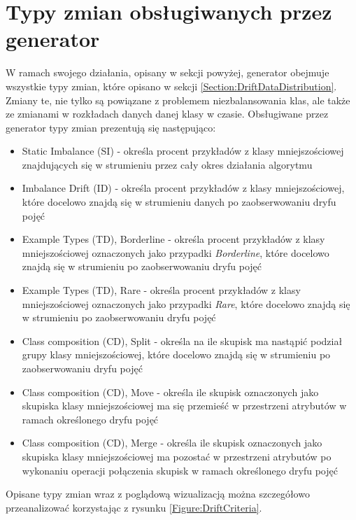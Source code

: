 \section{Typy zmian obsługiwanych przez generator}

\noindent W ramach swojego działania, opisany w sekcji powyżej, generator obejmuje wszystkie typy zmian, które opisano w sekcji \ref{Section:DriftDataDistribution}. Zmiany te, nie tylko są powiązane z problemem niezbalansowania klas, ale także ze zmianami w rozkładach danych danej klasy w czasie. Obsługiwane przez generator typy zmian prezentują się następująco:

\begin{itemize}
    \item Static Imbalance (SI) - określa procent przykładów z klasy mniejszościowej znajdujących się w strumieniu przez cały okres działania algorytmu
    \item Imbalance Drift (ID) - określa procent przykładów z klasy mniejszościowej, które docelowo znajdą się w strumieniu danych po zaobserwowaniu dryfu pojęć
    \item Example Types (TD), Borderline - określa procent przykładów z klasy mniejszościowej oznaczonych jako przypadki \textit{Borderline}, które docelowo znajdą się w strumieniu po zaobserwowaniu dryfu pojęć
    \item Example Types (TD), Rare - określa procent przykładów z klasy mniejszościowej oznaczonych jako przypadki \textit{Rare}, które docelowo znajdą się w strumieniu po zaobserwowaniu dryfu pojęć
    \item Class composition (CD), Split - określa na ile skupisk ma nastąpić podział grupy klasy mniejszościowej, które docelowo znajdą się w strumieniu po zaobserwowaniu dryfu pojęć
    \item Class composition (CD), Move - określa ile skupisk oznaczonych jako skupiska klasy mniejszościowej ma się przemieść w przestrzeni atrybutów w ramach określonego dryfu pojęć
    \item Class composition (CD), Merge - określa ile skupisk oznaczonych jako skupiska klasy mniejszościowej ma pozostać w przestrzeni atrybutów po wykonaniu operacji połączenia skupisk w ramach określonego dryfu pojęć
\end{itemize}

\newpage

\noindent Opisane typy zmian wraz z poglądową wizualizacją można szczegółowo przeanalizować korzystając z rysunku \ref{Figure:DriftCriteria}.


